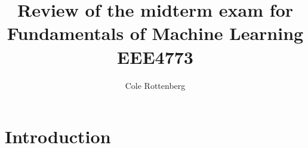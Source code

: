 \documentclass[12pt]{article}
\begin{document}
\title{Review of the midterm exam for Fundamentals of Machine Learning EEE4773}
\author{Cole Rottenberg}

\maketitle

\section{Introduction}
\end{document}
